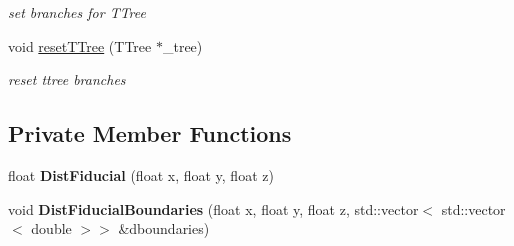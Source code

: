 \begin{DoxyCompactItemize}
\begin{DoxyCompactList}\small\item\em set branches for T\+Tree \end{DoxyCompactList}\item 
void \hyperlink{classanalysis_1_1ContainmentAnalysis_abf05f474025861ada4b8ef1299bd24ff}{reset\+T\+Tree} (T\+Tree $\ast$\+\_\+tree)\hypertarget{classanalysis_1_1ContainmentAnalysis_abf05f474025861ada4b8ef1299bd24ff}{}\label{classanalysis_1_1ContainmentAnalysis_abf05f474025861ada4b8ef1299bd24ff}

\begin{DoxyCompactList}\small\item\em reset ttree branches \end{DoxyCompactList}\end{DoxyCompactItemize}
\subsection*{Private Member Functions}
\begin{DoxyCompactItemize}
\item 
float {\bfseries Dist\+Fiducial} (float x, float y, float z)\hypertarget{classanalysis_1_1ContainmentAnalysis_af1ae4a6e17c26624f1ffc789a1a28370}{}\label{classanalysis_1_1ContainmentAnalysis_af1ae4a6e17c26624f1ffc789a1a28370}

\item 
void {\bfseries Dist\+Fiducial\+Boundaries} (float x, float y, float z, std\+::vector$<$ std\+::vector$<$ double $>$$>$ \&dboundaries)\hypertarget{classanalysis_1_1ContainmentAnalysis_a403e7651d9e20b4f672232e05a967472}{}\label{classanalysis_1_1ContainmentAnalysis_a403e7651d9e20b4f672232e05a967472}

\end{DoxyCompactItemize}
